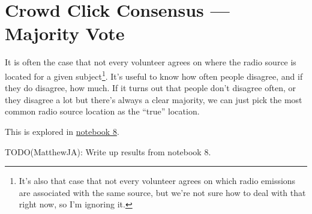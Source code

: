 \documentclass[a4paper]{article}
\begin{document}
    \section{Crowd Click Consensus --- Majority Vote}

        It is often the case that not every volunteer agrees on where the radio source is located for a given subject\footnote{It's also that case that not every volunteer agrees on which radio emissions are associated with the same source, but we're not sure how to deal with that right now, so I'm ignoring it.}. It's useful to know how often people disagree, and if they do disagree, how much. If it turns out that people don't disagree often, or they disagree a lot but there's always a clear majority, we can just pick the most common radio source location as the ``true'' location.

        This is explored in \href{https://github.com/chengsoonong/crowdastro/blob/master/notebooks/8_click_consensus_distribution.ipynb}{notebook 8}.

        TODO(MatthewJA): Write up results from notebook 8.

    
    
\end{document}

